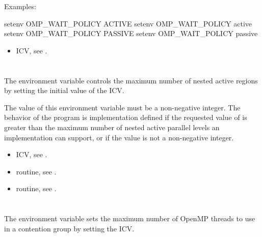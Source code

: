 Examples:
\begin{ompEnv}
setenv OMP_WAIT_POLICY ACTIVE
setenv OMP_WAIT_POLICY active
setenv OMP_WAIT_POLICY PASSIVE
setenv OMP_WAIT_POLICY passive
\end{ompEnv}

\crossreferences
\begin{itemize}
\item {} ICV, see .
\end{itemize}










\section{}
\label{sec:OMP_MAX_ACTIVE_LEVELS}
The  environment variable controls the maximum number
of nested active  regions by setting the initial value of the  ICV.

The value of this environment variable must be a non-negative integer. The behavior of
the program is implementation defined if the requested value of
 is greater than the maximum number of nested active
parallel levels an implementation can support, or if the value is not a non-negative
integer.

\crossreferences
\begin{itemize}
\item {} ICV, see .

\item {} routine, see .

\item {} routine, see .
\end{itemize}










\section{}
\label{sec:OMP_THREAD_LIMIT}
The  environment variable sets the maximum number of OpenMP threads to use in a contention group by setting the  ICV.

